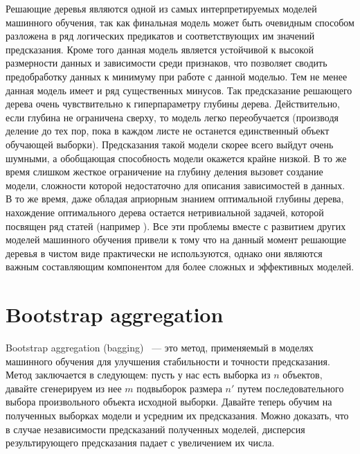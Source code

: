 Решающие деревья являются одной из самых интерпретируемых моделей машинного обучения, так как финальная модель может быть очевидным способом разложена в ряд логических предикатов и соответствующих им значений предсказания. Кроме того данная модель является устойчивой к высокой размерности данных и зависимости среди признаков, что позволяет сводить предобработку данных к минимуму при работе с данной моделью. Тем не менее данная модель имеет и ряд существенных минусов. Так предсказание решающего дерева очень чувствительно к гиперпараметру глубины дерева. Действительно, если глубина не ограничена сверху, то модель легко переобучается (производя деление до тех пор, пока в каждом листе не останется единственный объект обучающей выборки). Предсказания такой модели скорее всего выйдут очень шумными, а обобщающая способность модели окажется крайне низкой. В то же время слишком жесткое ограничение на глубину деления вызовет создание модели, сложности которой недостаточно для описания зависимостей в данных. В то же время, даже обладая априорным знанием оптимальной глубины дерева, нахождение оптимального дерева остается нетривиальной задачей, которой посвящен ряд статей (например \cite{Masa}). Все эти проблемы вместе с развитием других моделей машинного обучения привели к тому что на данный момент решающие деревья в чистом виде практически не используются, однако они являются важным составляющим компонентом для более сложных и эффективных моделей.

\section{Bootstrap aggregation}

Bootstrap aggregation (bagging) \cite{breiman1996bagging}~--- это метод, применяемый в моделях машинного обучения для улучшения стабильности и точности предсказания. Метод заключается в следующем: пусть у нас есть выборка из $n$ объектов, давайте сгенерируем из нее $m$ подвыборок размера $n'$ путем последовательного выбора произвольного объекта исходной выборки. Давайте теперь обучим на полученных выборках модели и усредним их предсказания. Можно доказать, что в случае независимости предсказаний полученных моделей, дисперсия результирующего предсказания падает с увеличением их числа.

